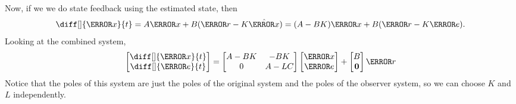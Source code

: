 Now, if we we do state feedback using the estimated state, then
\[
  \diff[]{\V{x}}{t} = A\V{x}+B(\V{r}-K\hat{\V{x}}) = (A-BK)\V{x}+B(\V{r}-K\V{e}).
\]
Looking at the combined system,
\[
  \begin{bmatrix} \diff[]{\V{x}}{t} \\ \diff[]{\V{e}}{t} \end{bmatrix}
  = \begin{bmatrix} A-BK & -BK \\ 0 & A-LC \end{bmatrix} \begin{bmatrix} \V{x} \\ \V{e} \end{bmatrix}
  + \begin{bmatrix} B \\ \bs{0} \end{bmatrix}\V{r}
\]
Notice that the poles of this system are just the poles of the original system and the poles of the observer system, so we can choose $K$ and $L$ independently.
